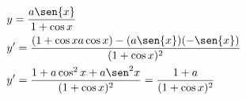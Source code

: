 \begin{ex}
\begin{align}
&y=\frac{a\sen{x}}{1+\cos{x}}\nonumber\\
&y'=\frac{(1+\cos{x}a\cos{x})-(a\sen{x})(-\sen{x})}{(1+\cos{x})^2}\nonumber\\
&y'=\frac{1+a\cos^2{x}+a\sen^2{x}}{(1+\cos{x})^2}=\frac{1+a}{(1+\cos{x})^2}\nonumber
\end{align}
\end{ex}
